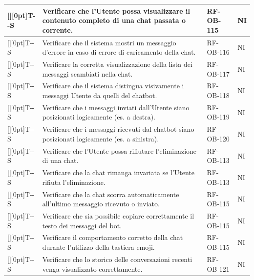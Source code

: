 \documentclass[a4paper,12pt]{article}
\newcounter{testsys}
\newcommand{\systestcode}{%
  \raisebox{0pt}[\height][0pt]{\hypertarget{T-\arabic{testsys}-S}{}}T-\arabic{testsys}-S%
}
\begin{document}
\begin{longtable}{| >{\centering\arraybackslash}p{} | >{\raggedright\arraybackslash}p{} | >{\centering\arraybackslash}p{} | >{\centering\arraybackslash}p{} |}
\stepcounter{testsys} \systestcode & Verificare che l'Utente possa visualizzare il contenuto completo di una chat passata o corrente. & RF-OB-115 & NI \\
\hline

\stepcounter{testsys} \systestcode & Verificare che il sistema mostri un messaggio d'errore in caso di errore di caricamento della chat. & RF-OB-116 & NI \\
\hline

\stepcounter{testsys} \systestcode & Verificare la corretta visualizzazione della lista dei messaggi scambiati nella chat. & RF-OB-117 & NI \\
\hline

\stepcounter{testsys} \systestcode & Verificare che il sistema distingua visivamente i messaggi Utente da quelli del chatbot. & RF-OB-118 & NI \\
\hline

\stepcounter{testsys} \systestcode & Verificare che i messaggi inviati dall'Utente siano posizionati logicamente (es. a destra). & RF-OB-119 & NI \\
\hline

\stepcounter{testsys} \systestcode & Verificare che i messaggi ricevuti dal chatbot siano posizionati logicamente (es. a sinistra). & RF-OB-120 & NI \\
\hline

\stepcounter{testsys} \systestcode & Verificare che l'Utente possa rifiutare l'eliminazione di una chat. & RF-OB-113 & NI \\
\hline

\stepcounter{testsys} \systestcode & Verificare che la chat rimanga invariata se l'Utente rifiuta l'eliminazione. & RF-OB-113 & NI \\
\hline

\stepcounter{testsys} \systestcode & Verificare che la chat scorra automaticamente all'ultimo messaggio ricevuto o inviato. & RF-OB-115 & NI \\
\hline

\stepcounter{testsys} \systestcode & Verificare che sia possibile copiare correttamente il testo dei messaggi del bot. & RF-OB-115 & NI \\
\hline

\stepcounter{testsys} \systestcode & Verificare il comportamento corretto della chat durante l'utilizzo della tastiera emoji. & RF-OB-115 & NI \\
\hline

\stepcounter{testsys} \systestcode & Verificare che lo storico delle conversazioni recenti venga visualizzato correttamente. & RF-OB-121 & NI \\
\hline


\end{longtable}
\end{document}

